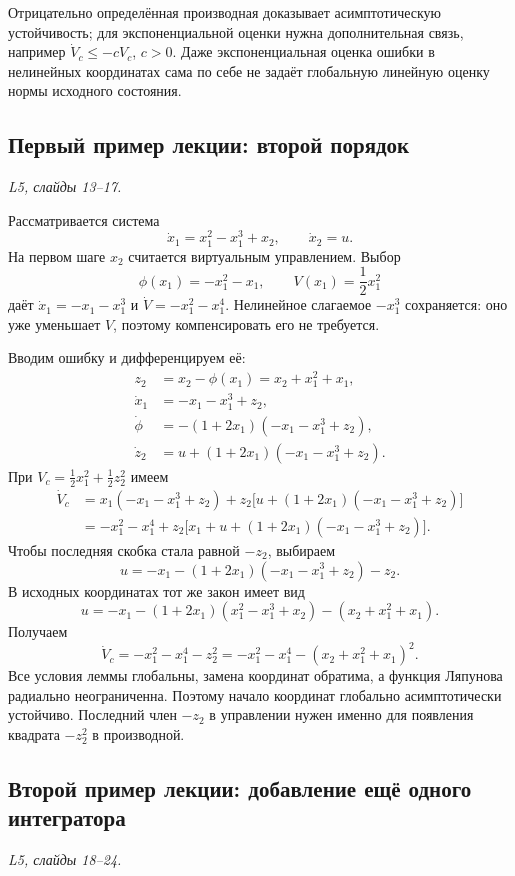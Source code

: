 Отрицательно определённая производная доказывает асимптотическую
устойчивость; для экспоненциальной оценки нужна дополнительная связь,
например $\dot V_c\le-cV_c$, $c>0$. Даже экспоненциальная оценка ошибки
в нелинейных координатах сама по себе не задаёт глобальную линейную
оценку нормы исходного состояния.

\subsection{Первый пример лекции: второй порядок}
\textit{L5, слайды 13--17.}

Рассматривается система
\[
  \dot x_1=x_1^2-x_1^3+x_2,\qquad \dot x_2=u.
\]
На первом шаге $x_2$ считается виртуальным управлением. Выбор
\[
  \phi(x_1)=-x_1^2-x_1,\qquad V(x_1)=\frac12x_1^2
\]
даёт $\dot x_1=-x_1-x_1^3$ и
$\dot V=-x_1^2-x_1^4$. Нелинейное слагаемое $-x_1^3$ сохраняется:
оно уже уменьшает $V$, поэтому компенсировать его не требуется.

Вводим ошибку и дифференцируем её:
\begin{align*}
  z_2&=x_2-\phi(x_1)=x_2+x_1^2+x_1,\\
  \dot x_1&=-x_1-x_1^3+z_2,\\
  \dot\phi&=-(1+2x_1)(-x_1-x_1^3+z_2),\\
  \dot z_2&=u+(1+2x_1)(-x_1-x_1^3+z_2).
\end{align*}
При $V_c=\tfrac12x_1^2+\tfrac12z_2^2$ имеем
\begin{align*}
  \dot V_c
  &=x_1(-x_1-x_1^3+z_2)
    +z_2\bigl[u+(1+2x_1)(-x_1-x_1^3+z_2)\bigr]\\
  &=-x_1^2-x_1^4+
    z_2\bigl[x_1+u+(1+2x_1)(-x_1-x_1^3+z_2)\bigr].
\end{align*}
Чтобы последняя скобка стала равной $-z_2$, выбираем
\[
  u=-x_1-(1+2x_1)(-x_1-x_1^3+z_2)-z_2.
\]
В исходных координатах тот же закон имеет вид
\[
  u=-x_1-(1+2x_1)(x_1^2-x_1^3+x_2)
    -(x_2+x_1^2+x_1).
\]
Получаем
\[
  \dot V_c=-x_1^2-x_1^4-z_2^2
  =-x_1^2-x_1^4-(x_2+x_1^2+x_1)^2.
\]
Все условия леммы глобальны, замена координат обратима, а функция
Ляпунова радиально неограниченна. Поэтому начало координат глобально
асимптотически устойчиво. Последний член $-z_2$ в управлении нужен
именно для появления квадрата $-z_2^2$ в производной.

\subsection{Второй пример лекции: добавление ещё одного интегратора}
\textit{L5, слайды 18--24.}

